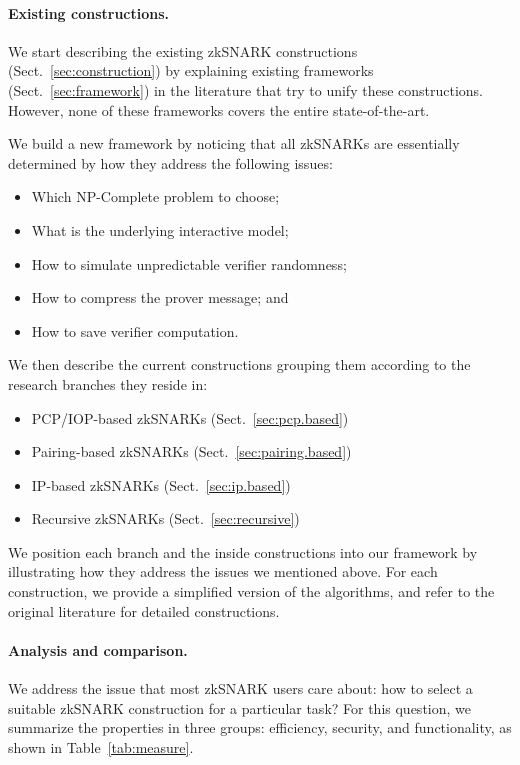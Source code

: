 \documentclass[acmtog]{acmart}
\begin{document}
\paragraph{Existing constructions.}
We start describing the existing zkSNARK constructions (Sect.~\ref{sec:construction}) by explaining existing frameworks (Sect.~\ref{sec:framework}) in the literature that try to unify these constructions.
However, none of these frameworks covers the entire state-of-the-art.

We build a new framework by noticing that all zkSNARKs are essentially determined by how they address the following issues:
\begin{itemize}
	\item Which NP-Complete problem to choose;
	\item What is the underlying interactive model;
	\item How to simulate unpredictable verifier randomness;
	\item How to compress the prover message; and
	\item How to save verifier computation.
\end{itemize}

We then describe the current constructions grouping them according to the research branches they reside in:
\begin{itemize}
	\item PCP/IOP-based zkSNARKs (Sect.~\ref{sec:pcp.based})
	\item Pairing-based zkSNARKs (Sect.~\ref{sec:pairing.based})
	\item IP-based zkSNARKs (Sect.~\ref{sec:ip.based})
	\item Recursive zkSNARKs (Sect.~\ref{sec:recursive})
\end{itemize}
We position each branch and the inside constructions into our framework by illustrating how they address the issues we mentioned above.
For each construction, we provide a simplified version of the algorithms, and refer to the original literature for detailed constructions.

\paragraph{Analysis and comparison.}
We address the issue that most zkSNARK users care about: how to select a suitable zkSNARK construction for a particular task?
For this question, we summarize the properties in three groups: efficiency, security, and functionality, as shown in Table~\ref{tab:measure}.
\end{document}
